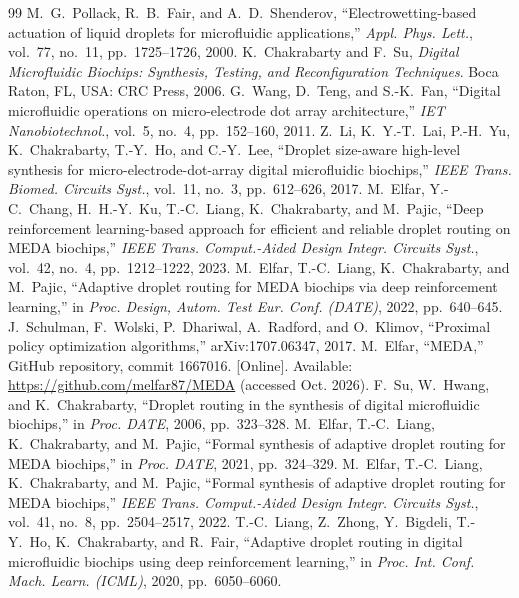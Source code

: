 \documentclass[conference,onecolumn,11pt]{IEEEtran}
\begin{document}
\begin{thebibliography}{99}
 M.~G.~Pollack, R.~B.~Fair, and A.~D.~Shenderov, ``Electrowetting-based actuation of liquid droplets for microfluidic applications,'' \emph{Appl. Phys. Lett.}, vol.~77, no.~11, pp.~1725--1726, 2000.
 K.~Chakrabarty and F.~Su, \emph{Digital Microfluidic Biochips: Synthesis, Testing, and Reconfiguration Techniques}. Boca Raton, FL, USA: CRC Press, 2006.
 G.~Wang, D.~Teng, and S.-K.~Fan, ``Digital microfluidic operations on micro-electrode dot array architecture,'' \emph{IET Nanobiotechnol.}, vol.~5, no.~4, pp.~152--160, 2011.
 Z.~Li, K.~Y.-T.~Lai, P.-H.~Yu, K.~Chakrabarty, T.-Y.~Ho, and C.-Y.~Lee, ``Droplet size-aware high-level synthesis for micro-electrode-dot-array digital microfluidic biochips,'' \emph{IEEE Trans. Biomed. Circuits Syst.}, vol.~11, no.~3, pp.~612--626, 2017.
 M.~Elfar, Y.-C.~Chang, H.~H.-Y.~Ku, T.-C.~Liang, K.~Chakrabarty, and M.~Pajic, ``Deep reinforcement learning-based approach for efficient and reliable droplet routing on MEDA biochips,'' \emph{IEEE Trans. Comput.-Aided Design Integr. Circuits Syst.}, vol.~42, no.~4, pp.~1212--1222, 2023.
 M.~Elfar, T.-C.~Liang, K.~Chakrabarty, and M.~Pajic, ``Adaptive droplet routing for MEDA biochips via deep reinforcement learning,'' in \emph{Proc. Design, Autom. Test Eur. Conf. (DATE)}, 2022, pp.~640--645.
 J.~Schulman, F.~Wolski, P.~Dhariwal, A.~Radford, and O.~Klimov, ``Proximal policy optimization algorithms,'' arXiv:1707.06347, 2017.
 M.~Elfar, ``MEDA,'' GitHub repository, commit 1667016. [Online]. Available: \url{https://github.com/melfar87/MEDA} (accessed Oct. 2026).
 F.~Su, W.~Hwang, and K.~Chakrabarty, ``Droplet routing in the synthesis of digital microfluidic biochips,'' in \emph{Proc. DATE}, 2006, pp.~323--328.
 M.~Elfar, T.-C.~Liang, K.~Chakrabarty, and M.~Pajic, ``Formal synthesis of adaptive droplet routing for MEDA biochips,'' in \emph{Proc. DATE}, 2021, pp.~324--329.
 M.~Elfar, T.-C.~Liang, K.~Chakrabarty, and M.~Pajic, ``Formal synthesis of adaptive droplet routing for MEDA biochips,'' \emph{IEEE Trans. Comput.-Aided Design Integr. Circuits Syst.}, vol.~41, no.~8, pp.~2504--2517, 2022.
 T.-C.~Liang, Z.~Zhong, Y.~Bigdeli, T.-Y.~Ho, K.~Chakrabarty, and R.~Fair, ``Adaptive droplet routing in digital microfluidic biochips using deep reinforcement learning,'' in \emph{Proc. Int. Conf. Mach. Learn. (ICML)}, 2020, pp.~6050--6060.

\end{thebibliography}
\end{document}
